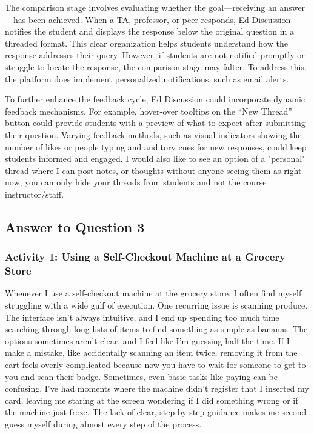 \documentclass[
	letterpaper, %
]{jdf}
\begin{document}
The comparison stage involves evaluating whether the goal—receiving an answer—has been achieved. When a TA, professor, or peer responds, Ed Discussion notifies the student and displays the response below the original question in a threaded format. This clear organization helps students understand how the response addresses their query. However, if students are not notified promptly or struggle to locate the response, the comparison stage may falter. To address this, the platform does implement personalized notifications, such as email alerts.

To further enhance the feedback cycle, Ed Discussion could incorporate dynamic feedback mechanisms. For example, hover-over tooltips on the “New Thread” button could provide students with a preview of what to expect after submitting their question. Varying feedback methods, such as visual indicators showing the number of likes or people typing and auditory cues for new responses, could keep students informed and engaged. I would also like to see an option of a "personal" thread where I can post notes, or thoughts without anyone seeing them as right now, you can only hide your threads from students and not the course instructor/staff. 
\newpage

\subsection{Answer to Question 3}
\subsubsection {Activity 1: Using a Self-Checkout Machine at a Grocery Store}
Whenever I use a self-checkout machine at the grocery store, I often find myself struggling with a wide gulf of execution. One recurring issue is scanning produce. The interface isn’t always intuitive, and I end up spending too much time searching through long lists of items to find something as simple as bananas. The options sometimes aren’t clear, and I feel like I’m guessing half the time. If I make a mistake, like accidentally scanning an item twice, removing it from the cart feels overly complicated because now you have to wait for someone to get to you and scan their badge. 
Sometimes, even basic tasks like paying can be confusing. I’ve had moments where the machine didn’t register that I inserted my card, leaving me staring at the screen wondering if I did something wrong or if the machine just froze. The lack of clear, step-by-step guidance makes me second-guess myself during almost every step of the process.
\end{document}
